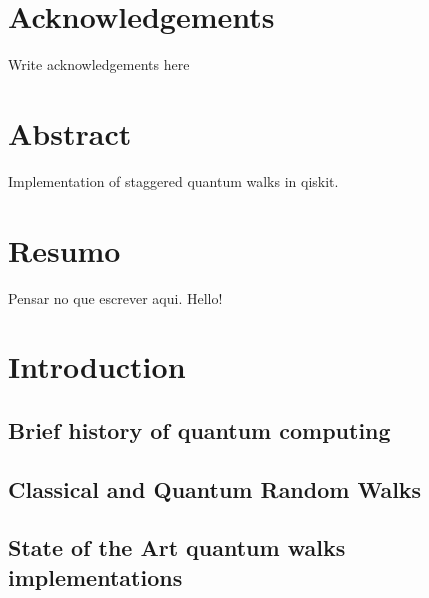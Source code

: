 \documentclass[
oneside,
11pt, a4paper,
footinclude=true,
headinclude=true,
cleardoublepage=empty
]{scrbook}
\author{Jaime Santos}
\date{\myear} %
\begin{document}
\umfrontcover	
\umtitlepage

\chapter*{Acknowledgements}
Write acknowledgements here


\chapter*{Abstract}
Implementation of staggered quantum walks in qiskit.

\cleardoublepage
\chapter*{Resumo}
Pensar no que escrever aqui.
Hello!	

\tableofcontents
\listoffigures
\listoftables



\chapter{Introduction}
\section{Brief history of quantum computing}

\section{Classical and Quantum Random Walks}

\section{State of the Art quantum walks implementations}

\end{document}
